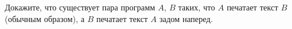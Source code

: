 Докажите, что существует пара программ $A$, $B$ таких, что $A$ печатает текст $B$ (обычным образом), а
$B$ печатает текст $A$ задом наперед.
